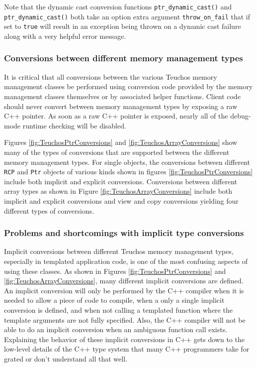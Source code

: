 \documentclass[pdf,ps2pdf,11pt]{SANDreport}
\begin{document}
Note that the dynamic cast conversion functions
{}\texttt{ptr\_dynamic\_cast()} and {}\texttt{ptr\_dynamic\_cast()}
both take an option extra argument {}\texttt{throw\_on\_fail} that if
set to {}\texttt{true} will result in an exception being thrown on a
dynamic cast failure along with a very helpful error message.


%
{}\subsubsection{Conversions between different memory management types}
\label{sec:teuchos-type-conversions}
%

It is critical that all conversions between the various Teuchos memory
management classes be performed using conversion code provided by the
memory management classes themselves or by associated helper
functions.  Client code should never convert between memory management
types by exposing a raw C++ pointer.  As soon as a raw C++ pointer is
exposed, nearly all of the debug-mode runtime checking will be
disabled.

Figures {}\ref{fig:TeuchosPtrConversions} and
{}\ref{fig:TeuchosArrayConversions} show many of the types of
conversions that are supported between the different memory management
types.  For single objects, the conversions between different
{}\texttt{RCP} and {}\texttt{Ptr} objects of various kinds shown in
figures {}\ref{fig:TeuchosPtrConversions} include both implicit and
explicit conversions.  Conversions between different array types as
shown in Figure {}\ref{fig:TeuchosArrayConversions} include both
implicit and explicit conversions and view and copy conversions
yielding four different types of conversions.

%
{}\subsubsection{Problems and shortcomings with implicit type
conversions}
\label{sec:conversion-problems}
%

Implicit conversions between different Teuchos memory management
types, especially in templated application code, is one of the most
confusing aspects of using these classes.  As shown in Figures
{}\ref{fig:TeuchosPtrConversions} and
{}\ref{fig:TeuchosArrayConversions}, many different implicit
conversions are defined.  An implicit conversion will only be
performed by the C++ compiler when it is needed to allow a piece of
code to compile, when a only a single implicit conversion is defined,
and when not calling a templated function where the template arguments
are not fully specified.  Also, the C++ compiler will not be able to
do an implicit conversion when an ambiguous function call exists.
Explaining the behavior of these implicit conversions in C++ gets down
to the low-level details of the C++ type system that many C++
programmers take for grated or don't understand all that well.
\end{document}
